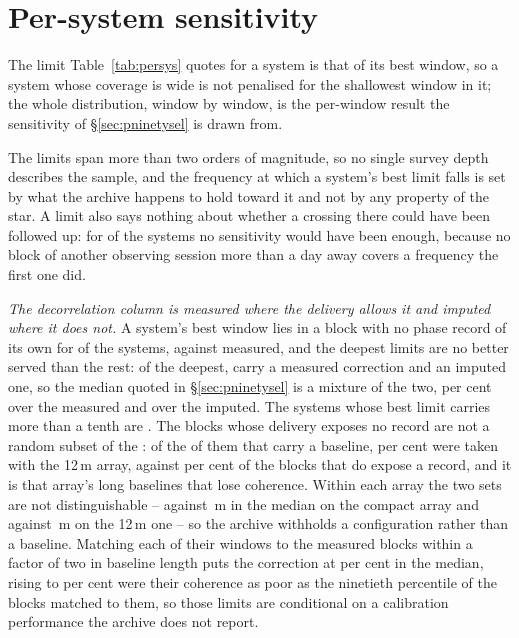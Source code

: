 \section{Per-system sensitivity}
\label{app:persys}

The limit Table~\ref{tab:persys} quotes for a system is that of its best
window, so a system whose coverage is wide is not penalised for the
shallowest window in it; the whole distribution, window by window, is the
per-window result the sensitivity of \S\ref{sec:pninetysel} is drawn from.

The limits span more than two orders of magnitude, so no single survey depth
describes the sample, and the frequency at which a system's best limit falls
is set by what the archive happens to hold toward it and not by any
property of the star. A limit also says nothing about whether a crossing there
could have been followed up: for \ZcNoRepSys{} of the \NSysClassA{} systems
no sensitivity would have been enough, because no block of another observing
session more than a day away covers a frequency the first one did.

\emph{The decorrelation column is measured where the delivery allows it and
imputed where it does not.} A system's best window lies in a block with no
phase record of its own for \NgNDecImpSys{} of the \NSysClassA{} systems,
against \NgNDecMeasSys{} measured, and the deepest limits are no better
served than the rest: of the \NgNDeep{} deepest, \NgNDeepMeas{} carry a
measured correction and \NgNDeepImp{} an imputed one, so the median quoted in
\S\ref{sec:pninetysel} is a mixture of the two, \NgDecMeasMedPct{} per cent
over the measured and \NgDecImpMedPct{} over the imputed. The systems whose
best limit carries more than a tenth are \NmDecBigSys.
The \RpDecNUn{} blocks whose delivery exposes no record are not a random
subset of the \SensDecorNBlkTot: of the \NbDecNUnBl{} of them that carry a
baseline, \NbDecPctTwelveUn{} per cent were taken with the 12\,m array,
against \NbDecPctTwelveMeas{} per cent of the blocks that do expose a record,
and it is that array's long baselines that lose coherence. Within each array
the two sets are not distinguishable -- \NbDecBlSevenUn{} against
\NbDecBlSevenMeas\,m in the median on the compact array and
\NbDecBlTwelveUn{} against \NbDecBlTwelveMeas\,m on the 12\,m one -- so the
archive withholds a configuration rather than a baseline. Matching
each of their windows to the measured blocks within a factor of two in
baseline length puts the correction at \RpDecMatchMed{} per cent in the
median, rising to \RpDecMatchHi{} per cent were their coherence as poor as
the ninetieth percentile of the blocks matched to them, so those limits are
conditional on a calibration performance the archive does not report.

